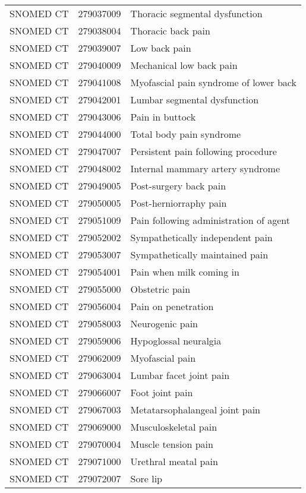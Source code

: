 \begin{longtable}{p{}p{}p{}}
  SNOMED CT & 279037009 & Thoracic segmental dysfunction \\ 
  SNOMED CT & 279038004 & Thoracic back pain \\ 
  SNOMED CT & 279039007 & Low back pain \\ 
  SNOMED CT & 279040009 & Mechanical low back pain \\ 
  SNOMED CT & 279041008 & Myofascial pain syndrome of lower back \\ 
  SNOMED CT & 279042001 & Lumbar segmental dysfunction \\ 
  SNOMED CT & 279043006 & Pain in buttock \\ 
  SNOMED CT & 279044000 & Total body pain syndrome \\ 
  SNOMED CT & 279047007 & Persistent pain following procedure \\ 
  SNOMED CT & 279048002 & Internal mammary artery syndrome \\ 
  SNOMED CT & 279049005 & Post-surgery back pain \\ 
  SNOMED CT & 279050005 & Post-herniorraphy pain \\ 
  SNOMED CT & 279051009 & Pain following administration of agent \\ 
  SNOMED CT & 279052002 & Sympathetically independent pain \\ 
  SNOMED CT & 279053007 & Sympathetically maintained pain \\ 
  SNOMED CT & 279054001 & Pain when milk coming in \\ 
  SNOMED CT & 279055000 & Obstetric pain \\ 
  SNOMED CT & 279056004 & Pain on penetration \\ 
  SNOMED CT & 279058003 & Neurogenic pain \\ 
  SNOMED CT & 279059006 & Hypoglossal neuralgia \\ 
  SNOMED CT & 279062009 & Myofascial pain \\ 
  SNOMED CT & 279063004 & Lumbar facet joint pain \\ 
  SNOMED CT & 279066007 & Foot joint pain \\ 
  SNOMED CT & 279067003 & Metatarsophalangeal joint pain \\ 
  SNOMED CT & 279069000 & Musculoskeletal pain \\ 
  SNOMED CT & 279070004 & Muscle tension pain \\ 
  SNOMED CT & 279071000 & Urethral meatal pain \\ 
  SNOMED CT & 279072007 & Sore lip \\ 

\end{longtable}
